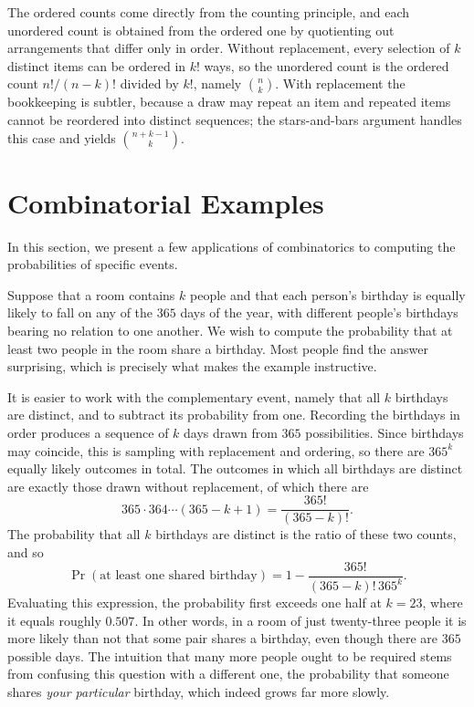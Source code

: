 The ordered counts come directly from the counting principle, and each unordered count is obtained from the ordered one by quotienting out arrangements that differ only in order.
Without replacement, every selection of $k$ distinct items can be ordered in $k!$ ways, so the unordered count is the ordered count $n!/(n-k)!$ divided by $k!$, namely $\binom{n}{k}$.
With replacement the bookkeeping is subtler, because a draw may repeat an item and repeated items cannot be reordered into distinct sequences; the stars-and-bars argument handles this case and yields $\binom{n + k - 1}{k}$.


\section{Combinatorial Examples}

In this section, we present a few applications of combinatorics to computing the probabilities of specific events.

\begin{example}
Suppose that a room contains $k$ people and that each person's birthday is equally likely to fall on any of the $365$ days of the year, with different people's birthdays bearing no relation to one another.
We wish to compute the probability that at least two people in the room share a birthday.
Most people find the answer surprising, which is precisely what makes the example instructive.

It is easier to work with the complementary event, namely that all $k$ birthdays are distinct, and to subtract its probability from one.
Recording the birthdays in order produces a sequence of $k$ days drawn from $365$ possibilities.
Since birthdays may coincide, this is sampling with replacement and ordering, so there are $365^k$ equally likely outcomes in total.
The outcomes in which all birthdays are distinct are exactly those drawn without replacement, of which there are
\begin{equation*}
365 \cdot 364 \cdots (365 - k + 1) = \frac{365!}{(365 - k)!} .
\end{equation*}
The probability that all $k$ birthdays are distinct is the ratio of these two counts, and so
\begin{equation*}
\Pr ( \text{at least one shared birthday} )
= 1 - \frac{365!}{(365 - k)! \, 365^k} .
\end{equation*}
Evaluating this expression, the probability first exceeds one half at $k = 23$, where it equals roughly $0.507$.
In other words, in a room of just twenty-three people it is more likely than not that some pair shares a birthday, even though there are $365$ possible days.
The intuition that many more people ought to be required stems from confusing this question with a different one, the probability that someone shares \emph{your particular} birthday, which indeed grows far more slowly.
\end{example}

